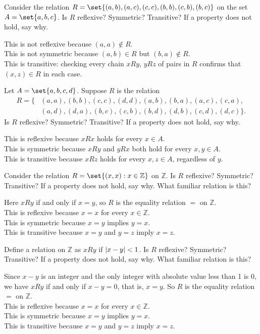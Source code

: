 \documentclass[DIN, pagenumber=false, fontsize=11pt, parskip=half]{scrartcl}
\begin{document}
\begin{problems}
    \problem Consider the relation $R = \set{(a,b),(a,c),(c,c),(b,b),(c,b),(b,c)}$ on the set $A = \set{a,b,c}$. Is $R$ reflexive? Symmetric? Transitive? If a property does not hold, say why.

    \answer This is not reflexive because $(a,a) \notin R$.\\ 
    This is not symmetric because $(a,b) \in R$ but $(b,a) \notin R$.\\ 
    This is transitive: checking every chain $xRy$, $yRz$ of pairs in $R$ confirms that $(x,z) \in R$ in each case.

    \problem Let $A = \set{a,b,c,d}$. Suppose $R$ is the relation
        \[
            \begin{aligned}
                R = \{ & (a,a),(b,b),(c,c),(d,d),(a,b),(b,a),(a,c),(c,a),\\
                       & (a,d),(d,a),(b,c),(c,b),(b,d),(d,b),(c,d),(d,c) \}.
            \end{aligned}
        \]
        Is $R$ reflexive? Symmetric? Transitive? If a property does not hold, say why.

    \answer This is reflexive because $xRx$ holds for every $x \in A$.\\ 
    This is symmetric because $xRy$ and $yRx$ both hold for every $x,y \in A$.\\ 
    This is transitive because $xRz$ holds for every $x,z \in A$, regardless of $y$.

    \problem Consider the relation $R = \set{(x,x) : x \in \mathbb{Z}}$ on $\mathbb{Z}$. Is $R$ reflexive? Symmetric? Transitive? If a property does not hold, say why. What familiar relation is this?

    \answer Here $xRy$ if and only if $x = y$, so $R$ is the equality relation $=$ on $\mathbb{Z}$.\\ 
    This is reflexive because $x = x$ for every $x \in \mathbb{Z}$.\\ 
    This is symmetric because $x = y$ implies $y = x$.\\ 
    This is transitive because $x = y$ and $y = z$ imply $x = z$.

    \problem Define a relation on $\mathbb{Z}$ as $xRy$ if $\lvert x-y \rvert < 1$. Is $R$ reflexive? Symmetric? Transitive? If a property does not hold, say why. What familiar relation is this?

    \answer Since $x-y$ is an integer and the only integer with absolute value less than 1 is 0, we have $xRy$ if and only if $x-y = 0$, that is, $x = y$. So $R$ is the equality relation $=$ on $\mathbb{Z}$.\\ 
    This is reflexive because $x = x$ for every $x \in \mathbb{Z}$.\\ 
    This is symmetric because $x = y$ implies $y = x$.\\ 
    This is transitive because $x = y$ and $y = z$ imply $x = z$.


\end{problems}
\end{document}
